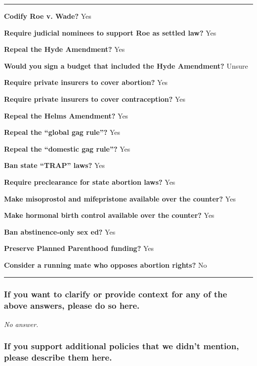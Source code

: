 \begin{center}\rule{0.5\linewidth}{\linethickness}\end{center}

\textbf{Codify Roe v. Wade?} Yes

\textbf{Require judicial nominees to support Roe as settled law?} Yes

\textbf{Repeal the Hyde Amendment?} Yes

\textbf{Would you sign a budget that included the Hyde Amendment?}
Unsure

\textbf{Require private insurers to cover abortion?} Yes

\textbf{Require private insurers to cover contraception?} Yes

\textbf{Repeal the Helms Amendment?} Yes

\textbf{Repeal the ``global gag rule''?} Yes

\textbf{Repeal the ``domestic gag rule''?} Yes

\textbf{Ban state ``TRAP'' laws?} Yes

\textbf{Require preclearance for state abortion laws?} Yes

\textbf{Make misoprostol and mifepristone available over the counter?}
Yes

\textbf{Make hormonal birth control available over the counter?} Yes

\textbf{Ban abstinence-only sex ed?} Yes

\textbf{Preserve Planned Parenthood funding?} Yes

\textbf{Consider a running mate who opposes abortion rights?} No

\begin{center}\rule{0.5\linewidth}{\linethickness}\end{center}

\hypertarget{if-you-want-to-clarify-or-provide-context-for-any-of-the-above-answers-please-do-so-here-1}{%
\subsubsection{If you want to clarify or provide context for any of the
above answers, please do so
here.}\label{if-you-want-to-clarify-or-provide-context-for-any-of-the-above-answers-please-do-so-here-1}}

\emph{No answer.}

\hypertarget{if-you-support-additional-policies-that-we-didnt-mention-please-describe-them-here-1}{%
\subsubsection{If you support additional policies that we didn't
mention, please describe them
here.}\label{if-you-support-additional-policies-that-we-didnt-mention-please-describe-them-here-1}}

